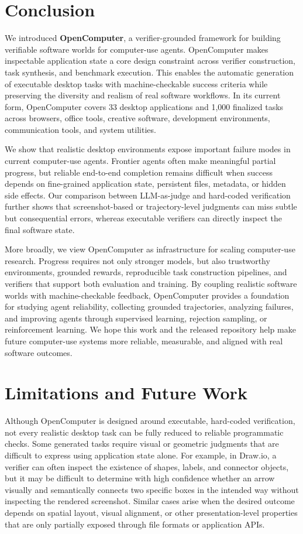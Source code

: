 \documentclass{llmxive}
\providecommand{\ours}{OpenComputer\xspace}
\begin{document}
\section{Conclusion}
\label{sec:conclusion}
We introduced \textbf{\ours}, a verifier-grounded framework for building verifiable software worlds for computer-use agents. \ours makes inspectable application state a core design constraint across verifier construction, task synthesis, and benchmark execution. This enables the automatic generation of executable desktop tasks with machine-checkable success criteria while preserving the diversity and realism of real software workflows. In its current form, \ours covers 33 desktop applications and 1,000 finalized tasks across browsers, office tools, creative software, development environments, communication tools, and system utilities.

We show that realistic desktop environments expose important failure modes in current computer-use agents. Frontier agents often make meaningful partial progress, but reliable end-to-end completion remains difficult when success depends on fine-grained application state, persistent files, metadata, or hidden side effects. Our comparison between LLM-as-judge and hard-coded verification further shows that screenshot-based or trajectory-level judgments can miss subtle but consequential errors, whereas executable verifiers can directly inspect the final software state.

More broadly, we view \ours as infrastructure for scaling computer-use research. Progress requires not only stronger models, but also trustworthy environments, grounded rewards, reproducible task construction pipelines, and verifiers that support both evaluation and training. By coupling realistic software worlds with machine-checkable feedback, \ours provides a foundation for studying agent reliability, collecting grounded trajectories, analyzing failures, and improving agents through supervised learning, rejection sampling, or reinforcement learning. We hope this work and the released repository help make future computer-use systems more reliable, measurable, and aligned with real software outcomes.
\section*{Limitations and Future Work}
\label{app:limitations}

Although OpenComputer is designed around executable, hard-coded verification, not every realistic desktop task can be fully reduced to reliable programmatic checks. Some generated tasks require visual or geometric judgments that are difficult to express using application state alone. For example, in Draw.io, a verifier can often inspect the existence of shapes, labels, and connector objects, but it may be difficult to determine with high confidence whether an arrow visually and semantically connects two specific boxes in the intended way without inspecting the rendered screenshot. Similar cases arise when the desired outcome depends on spatial layout, visual alignment, or other presentation-level properties that are only partially exposed through file formats or application APIs.
\end{document}
